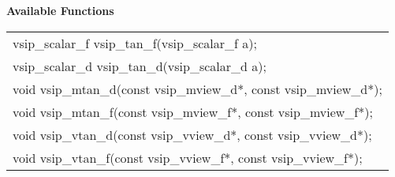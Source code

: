 \\\cvsiplh
\\ \hspace*{.8cm} \vspace*{.1cm} \textbf{Available Functions }
\\ \hspace*{1.1cm} {
\ttfamily
\begin{tabular}[H]{l}
vsip\_scalar\_f vsip\_tan\_f(vsip\_scalar\_f a);\\
vsip\_scalar\_d vsip\_tan\_d(vsip\_scalar\_d a);\\
void vsip\_mtan\_d(const vsip\_mview\_d*, const vsip\_mview\_d*);\\
void vsip\_mtan\_f(const vsip\_mview\_f*, const vsip\_mview\_f*);\\
void vsip\_vtan\_d(const vsip\_vview\_d*, const vsip\_vview\_d*);\\
void vsip\_vtan\_f(const vsip\_vview\_f*, const vsip\_vview\_f*);\\
\end{tabular}
}
\\\pyjvsiph
{}
